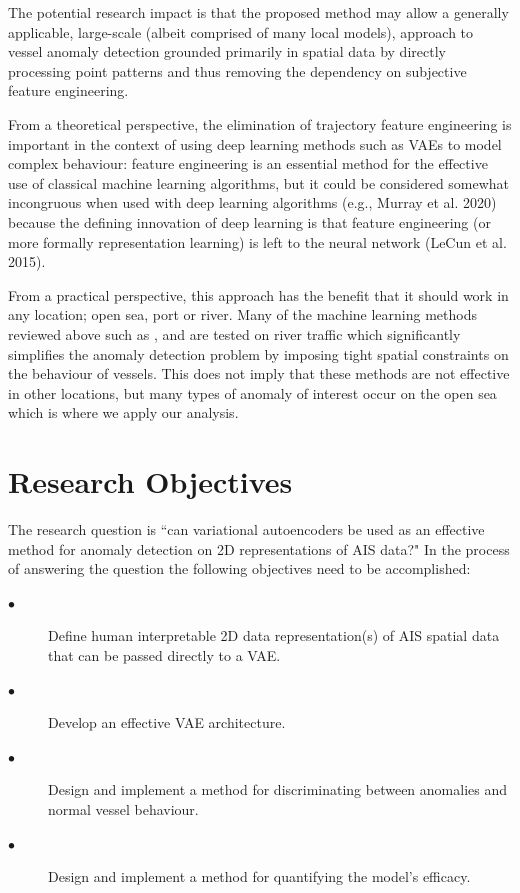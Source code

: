\documentclass{mldsmsc}
\begin{document}
The potential research impact is that the proposed method may allow a generally applicable, large-scale (albeit comprised of many local models), approach to vessel anomaly detection grounded primarily in spatial data by directly processing point patterns and thus removing the dependency on subjective feature engineering.

From a theoretical perspective, the elimination of trajectory feature engineering is important in the context of using deep learning methods such as VAEs to model complex behaviour:  feature engineering is an essential method for the effective use of classical machine learning algorithms, but it could be considered somewhat incongruous when used with deep learning algorithms (e.g., Murray et al. 2020) because the defining innovation of deep learning is that feature engineering (or more formally representation learning) is left to the neural network (LeCun et al. 2015).

From a practical perspective, this approach has the benefit that it should work in any location; open sea, port or river. Many of the machine learning methods reviewed above such as \cite{hu_intelligent_2023}, \cite{zhen_maritime_2017} and \cite{li_spatio-temporal_2018} are tested on river traffic which significantly simplifies the anomaly detection problem by imposing tight spatial constraints on the behaviour of vessels. This does not imply that these methods are not effective in other locations, but many types of anomaly of interest occur on the open sea which is where we apply our analysis. 

\section{Research Objectives}

The research question is ``can variational autoencoders be used as an effective method for anomaly detection on 2D representations of AIS data?"
In the process of answering the question the following objectives need to be accomplished:
\begin{description}
	\item [$\bullet$] Define human interpretable 2D data representation(s) of AIS spatial data that can be passed directly to a VAE.
	\item [$\bullet$] Develop an effective VAE architecture.
	\item [$\bullet$] Design and implement a method for discriminating between anomalies and normal vessel behaviour.
	\item [$\bullet$] Design and implement a method for quantifying the model's efficacy.
\end{description}
\end{document}
